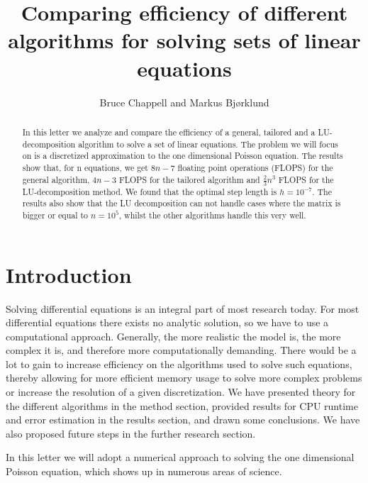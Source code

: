 \documentclass{emulateapj}
\begin{document}
\title{Comparing efficiency of different algorithms for solving sets of linear equations}

\author{Bruce Chappell and Markus Bjørklund}



\begin{abstract}
In this letter we analyze and compare the efficiency of a general, tailored and a LU-decomposition algorithm to solve a set of linear equations. The problem we will focus on is a discretized approximation to the one dimensional Poisson equation. The results show that, for n equations, we get $8n-7$ floating point operations (FLOPS) for the general algorithm, $4n-3$ FLOPS for the tailored algorithm and $\frac{2}{3}n^3$ FLOPS for the LU-decomposition method. We found that the optimal step length is $h=10^{-7}$. The results also show that the LU decomposition can not handle cases where the matrix is bigger or equal to $n=10^5$, whilst the other algorithms handle this very well.

\end{abstract}

\section{Introduction}
\label{sec:introduction}
Solving differential equations is an integral part of most research today. For most differential equations there exists no analytic solution, so we have to use a computational approach. Generally, the more realistic the model is, the more complex it is, and therefore more computationally demanding. There would be a lot to gain to increase efficiency on the algorithms used to solve such equations, thereby allowing for more efficient memory usage to solve more complex problems or increase the resolution of a given discretization. We have presented theory for the different algorithms in the method section, provided results for CPU runtime and error estimation in the results section, and drawn some conclusions. We have also proposed future steps in the further research section.

In this letter we will adopt a numerical approach to solving the one dimensional Poisson equation, which shows up in numerous areas of science.
\end{document}
